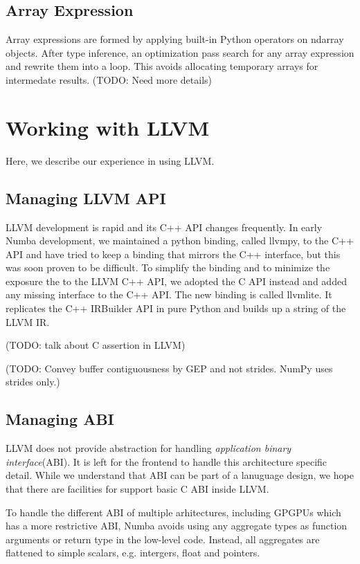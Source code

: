 \documentclass{acm_proc_article-sp}
\begin{document}
\subsection{Array Expression}

Array expressions are formed by applying built-in Python operators on
ndarray objects. After type inference, an optimization pass search for any
array expression and rewrite them into a loop. This avoids allocating
temporary arrays for intermedate results.
(TODO: Need more details)

\section{Working with LLVM}

Here, we describe our experience in using LLVM.

\subsection{Managing LLVM API}

LLVM development is rapid and its C++ API changes frequently.
In early Numba development, we maintained a python binding, called llvmpy,
to the C++ API and have tried to keep a binding that mirrors the C++ interface,
but this was soon proven to be difficult.
To simplify the binding and to minimize the exposure the to the LLVM C++ API,
we adopted the C API instead and added any missing interface to the C++ API.
The new binding is called llvmlite.  It replicates the C++ IRBuilder API in
pure Python and builds up a string of the LLVM IR.

(TODO: talk about C assertion in LLVM)

(TODO: Convey buffer contiguousness by GEP and not strides.
NumPy uses strides only.)

\subsection{Managing ABI}

LLVM does not provide abstraction for handling \textit{application binary
interface}(ABI). It is left for the frontend to handle this architecture
specific detail.  While we understand that ABI can be part of a lanuguage
design, we hope that there are facilities for support basic C ABI inside
LLVM.

To handle the different ABI of multiple arhitectures, including GPGPUs which
has a more restrictive ABI, Numba avoids using any aggregate types as function
arguments or return type in the low-level code.  Instead, all aggregates are
flattened to simple scalars, e.g. intergers, float and pointers.
\end{document}
